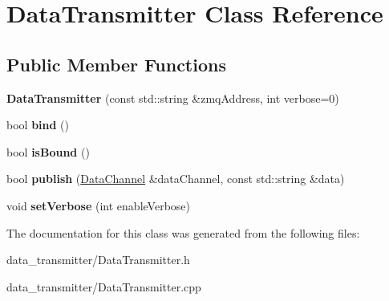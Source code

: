 \hypertarget{classDataTransmitter}{\section{Data\-Transmitter Class Reference}
\label{classDataTransmitter}
}
\subsection*{Public Member Functions}
\begin{DoxyCompactItemize}
\item 
\hypertarget{classDataTransmitter_aa7f4c42d9be74959e1b47d677f90b89a}{{\bfseries Data\-Transmitter} (const std\-::string \&zmq\-Address, int verbose=0)}\label{classDataTransmitter_aa7f4c42d9be74959e1b47d677f90b89a}

\item 
\hypertarget{classDataTransmitter_a3f59d7e1583605119a29f91b34580229}{bool {\bfseries bind} ()}\label{classDataTransmitter_a3f59d7e1583605119a29f91b34580229}

\item 
\hypertarget{classDataTransmitter_a69c46999eef168e059886387df9323af}{bool {\bfseries is\-Bound} ()}\label{classDataTransmitter_a69c46999eef168e059886387df9323af}

\item 
\hypertarget{classDataTransmitter_a0868ce996560bd27b56852ca9cd4f889}{bool {\bfseries publish} (\hyperlink{classDataChannel}{Data\-Channel} \&data\-Channel, const std\-::string \&data)}\label{classDataTransmitter_a0868ce996560bd27b56852ca9cd4f889}

\item 
\hypertarget{classDataTransmitter_ac8c1d4439fa56be0e05104aa717ccc0e}{void {\bfseries set\-Verbose} (int enable\-Verbose)}\label{classDataTransmitter_ac8c1d4439fa56be0e05104aa717ccc0e}

\end{DoxyCompactItemize}


The documentation for this class was generated from the following files\-:\begin{DoxyCompactItemize}
\item 
data\-\_\-transmitter/Data\-Transmitter.\-h\item 
data\-\_\-transmitter/Data\-Transmitter.\-cpp\end{DoxyCompactItemize}
